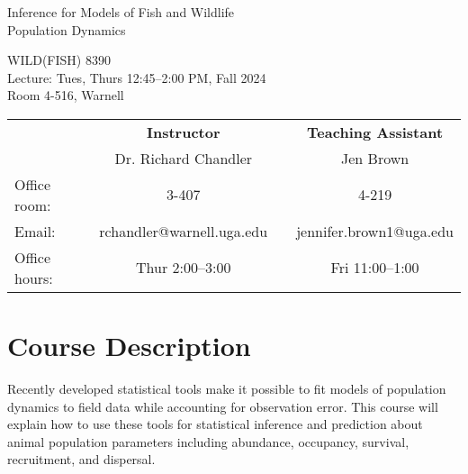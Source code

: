 \documentclass[12pt]{article}
\begin{document}
{\centering

{\Large \sc
  Inference for Models of Fish and Wildlife \\ Population Dynamics  
}
\vspace{6pt}

WILD(FISH) 8390  \\
Lecture: Tues, Thurs 12:45--2:00 PM, Fall 2024 \\
Room 4-516, Warnell \\


\normalsize

\vspace{12pt}

\begin{tabular}[h!]{lccc}
                     & \textbf{Instructor}       & \hspace{0.01cm} & \textbf{Teaching Assistant} \\
                     & Dr. Richard Chandler      &                 & Jen Brown                \\
Office room:         & 3-407                     &                 & 4-219                       \\
Email:               & rchandler@warnell.uga.edu &                 & jennifer.brown1@uga.edu       \\
Office hours:        & Thur 2:00--3:00           &                 & Fri 11:00--1:00             \\
\end{tabular}


}



\normalsize


\vspace{-2mm}
\section*{\normalsize Course Description}
\vspace{-4mm}
Recently developed statistical tools make it possible to fit models of
population dynamics to field data while accounting for observation
error. This course will explain how to use these tools for statistical
inference and prediction about animal population parameters including
abundance, occupancy, survival, recruitment, and dispersal.   
\end{document}
